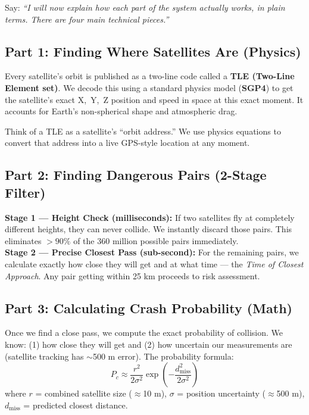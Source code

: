 \documentclass[11pt,a4paper]{article}
\begin{document}
\begin{presenterbox}
Say: \textit{``I will now explain how each part of the system actually works, in plain terms. There are four main technical pieces.''}
\end{presenterbox}

\subsection{Part 1: Finding Where Satellites Are (Physics)}

Every satellite's orbit is published as a two-line code called a \textbf{TLE (Two-Line Element set)}. We decode this using a standard physics model (\textbf{SGP4}) to get the satellite's exact \mbox{X, Y, Z} position and speed in space at this exact moment. It accounts for Earth's non-spherical shape and atmospheric drag.

\begin{tcolorbox}[colback=lightgray, colframe=gray!30, title=\textbf{Simple Analogy}]
\small Think of a TLE as a satellite's ``orbit address.'' We use physics equations to convert that address into a live GPS-style location at any moment.
\end{tcolorbox}

\subsection{Part 2: Finding Dangerous Pairs (2-Stage Filter)}

\begin{tcolorbox}[colback=lightgray, colframe=gray!30]
\textbf{Stage 1 --- Height Check (milliseconds):} If two satellites fly at completely different heights, they can never collide. We instantly discard those pairs. This eliminates $>90\%$ of the 360 million possible pairs immediately.\\[6pt]
\textbf{Stage 2 --- Precise Closest Pass (sub-second):} For the remaining pairs, we calculate exactly how close they will get and at what time --- the \textit{Time of Closest Approach}. Any pair getting within 25 km proceeds to risk assessment.
\end{tcolorbox}

\subsection{Part 3: Calculating Crash Probability (Math)}

Once we find a close pass, we compute the exact probability of collision. We know: (1) how close they will get and (2) how uncertain our measurements are (satellite tracking has $\sim$500 m error). The probability formula:
\[
P_c \approx \frac{r^2}{2\sigma^2} \exp\!\left(-\frac{d_{\text{miss}}^2}{2\sigma^2}\right)
\]
where $r$ = combined satellite size ($\approx$10 m), $\sigma$ = position uncertainty ($\approx$500 m), $d_{\text{miss}}$ = predicted closest distance.
\end{document}
